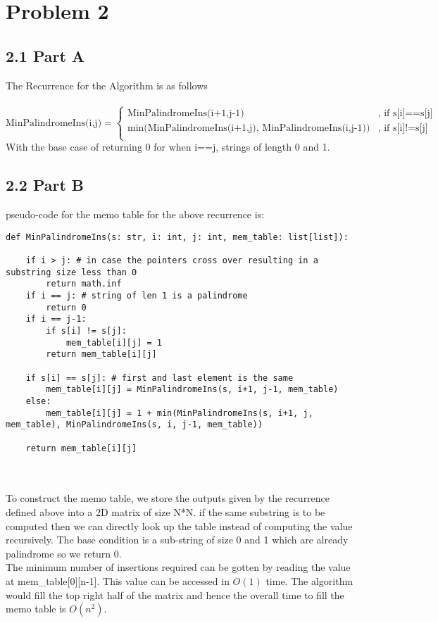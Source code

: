 \documentclass[12pt]{article}
\begin{document}
\section*{Problem 2}

\subsection*{2.1 Part A}
\vspace{10pt}

The Recurrence for the Algorithm is as follows \\~\\
\[
\text{MinPalindromeIns(i,j)}=
\begin{cases}
\text{MinPalindromeIns(i+1,j-1)}  & \text{, if s[i]==s[j]} \\
\text{min(MinPalindromeIns(i+1,j), MinPalindromeIns(i,j-1))} & \text{, if s[i]!=s[j]} \\
\end{cases}
\]
With the base case of returning 0 for when i==j, strings of length 0 and 1.
\subsection*{2.2 Part B}
\vspace{10pt}
pseudo-code for the memo table for the above recurrence is:
\begin{verbatim}
def MinPalindromeIns(s: str, i: int, j: int, mem_table: list[list]):
    
    if i > j: # in case the pointers cross over resulting in a substring size less than 0
        return math.inf
    if i == j: # string of len 1 is a palindrome
        return 0
    if i == j-1:
        if s[i] != s[j]: 
            mem_table[i][j] = 1
        return mem_table[i][j]
    
    if s[i] == s[j]: # first and last element is the same
        mem_table[i][j] = MinPalindromeIns(s, i+1, j-1, mem_table)
    else:
        mem_table[i][j] = 1 + min(MinPalindromeIns(s, i+1, j, mem_table), MinPalindromeIns(s, i, j-1, mem_table))
    
    return mem_table[i][j]
\end{verbatim}
\\~\\
To construct the memo table, we store the outputs given by the recurrence defined above into a 2D matrix of size N*N. if the same substring is to be computed then we can directly look up the table instead of computing the value recursively. The base condition is a sub-string of size 0 and 1 which are already palindrome so we return 0. 
\\ 
The minimum number of insertions required can be gotten by reading the value at mem\_table[0][n-1]. This value can be accessed in \(O(1)\) time. The algorithm would fill the top right half of the matrix and hence the overall time to fill the memo table is \(O(n^2)\).
\end{document}
